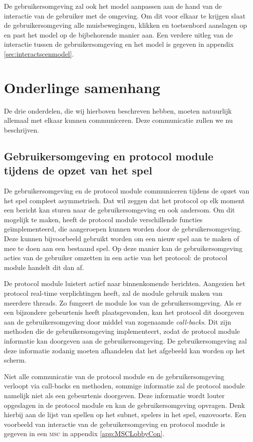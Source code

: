 \documentclass[a4paper,11pt, twoside]{article}
\begin{document}
	De gebruikersomgeving zal ook het model aanpassen aan de hand van de interactie van de gebruiker met de omgeving. Om dit voor elkaar te krijgen slaat de gebruikersomgeving alle muisbewegingen, klikken en toetsenbord aanslagen op en past het model op de bijbehorende manier aan. Een verdere uitleg van de interactie tussen de gebruikersomgeving en het model is gegeven in appendix \ref{sec:interactscenmodel}.

    \section{Onderlinge samenhang}
    De drie onderdelen, die wij hierboven beschreven hebben, moeten natuurlijk allemaal met elkaar kunnen communiceren. Deze communicatie zullen we nu beschrijven.

    \subsection{Gebruikersomgeving en protocol module tijdens de opzet van het spel}
    De gebruikersomgeving en de protocol module communiceren tijdens de opzet van het spel compleet asymmetrisch. Dat wil zeggen dat het protocol op elk moment een bericht kan sturen naar de gebruikersomgeving en ook andersom. Om dit mogelijk te maken, heeft de protocol module verschillende functies ge\"implementeerd, die aangeroepen kunnen worden door de gebruikersomgeving. Deze kunnen bijvoorbeeld gebruikt worden om een nieuw spel aan te maken of mee te doen aan een bestaand spel. Op deze manier kan de gebruikersomgeving acties van de gebruiker omzetten in een actie van het protocol: de protocol module handelt dit dan af.

    De protocol module luistert actief naar binnenkomende berichten. Aangezien het protocol real-time verplichtingen heeft, zal de module gebruik maken van meerdere threads. Zo fungeert de module los van de gebruikersomgeving. Als er een bijzondere gebeurtenis heeft plaatsgevonden, kan het protocol dit doorgeven aan de gebruikersomgeving door middel van zogenaamde \emph{call-backs}. Dit zijn methoden die de gebruikersomgeving implementeert, zodat de protocol module informatie kan doorgeven aan de gebruikersomgeving. De gebruikersomgeving zal deze informatie zodanig moeten afhandelen dat het afgebeeld kan worden op het scherm.

    Niet alle communicatie van de protocol module en de gebruikersomgeving verloopt via call-backs en methoden, sommige informatie zal de protocol module namelijk niet als een gebeurtenis doorgeven. Deze informatie wordt louter opgeslagen in de protocol module en kan de gebruikersomgeving opvragen. Denk hierbij aan de lijst van spellen op het subnet, spelers in het spel, enzovoorts. Een voorbeeld van interactie van de gebruikersomgeving en protocol module is gegeven in een \textsc{msc} in appendix \ref{app:MSCLobbyCon}.
\end{document}
